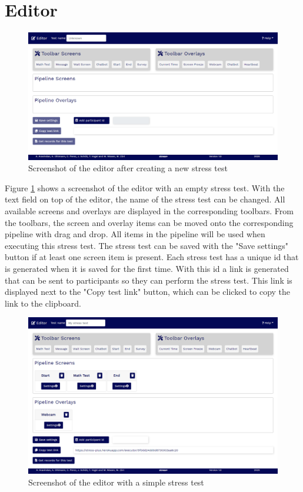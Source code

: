 \section{Editor}
\label{sec:editor}

\begin{figure}[htb]
    \centering
    \includegraphics[width=\textwidth]{figures/screenshot-editor.png}
    \caption{Screenshot of the editor after creating a new stress test}
    \label{fig:screenshot-editor}
\end{figure}

Figure \ref{fig:screenshot-editor} shows a screenshot of the editor with an empty stress test.
With the text field on top of the editor, the name of the stress test can be changed.
All available screens and overlays are displayed in the corresponding toolbars.
From the toolbars, the screen and overlay items can be moved onto the corresponding pipeline with drag and drop.
All items in the pipeline will be used when executing this stress test.
The stress test can be saved with the "Save settings" button if at least one screen item is present.
Each stress test has a unique id that is generated when it is saved for the first time.
With this id a link is generated that can be sent to participants so they can perform the stress test.
This link is displayed next to the "Copy test link" button, which can be clicked to copy the link to the clipboard.

\begin{figure}[htb]
    \centering
    \includegraphics[width=\textwidth]{figures/screenshot-editor-with-items.png}
    \caption{Screenshot of the editor with a simple stress test}
    \label{fig:screenshot-editor-with-items}
\end{figure}

